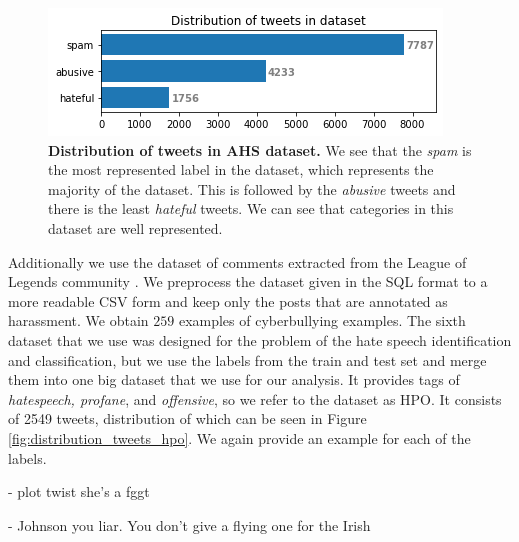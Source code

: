 \documentclass[fleqn,moreauthors,10pt]{ds_report}
\newcommand\bm{0.2pt}
\begin{document}
\begin{figure}[ht]\centering
	\includegraphics[width=\linewidth]{distribution_tweets_dataset2.png}
	\caption{\textbf{Distribution of tweets in AHS dataset.} We see that the \textit{spam} is the most represented label in the dataset, which represents the majority of the dataset. This is followed by the \textit{abusive} tweets and there is the least \textit{hateful} tweets. We can see that categories in this dataset are well represented.}
	\label{fig:distribution_tweets_dataset2}
\end{figure}

\noindent Additionally we use the dataset of comments extracted from the League of Legends community \cite{bretschneider2016detecting}. We preprocess the dataset given in the SQL format to a more readable CSV form and keep only the posts that are annotated as harassment. We obtain $259$ examples of cyberbullying examples. The sixth dataset that we use was designed for the problem of the hate speech identification and classification, but we use the labels from the train and test set and merge them into one big dataset that we use for our analysis. It provides tags of \textit{hatespeech, profane}, and \textit{offensive}, so we refer to the dataset as HPO. It consists of 2549 tweets, distribution of which can be seen in Figure \ref{fig:distribution_tweets_hpo}. We again provide an example for each of the labels.

\begin{tcolorbox}[colback=black!8, width=0.9\linewidth, center,arc=8pt,sharp corners=downhill, boxrule=0.3pt, left=\bm, top=\bm, right=\bm, bottom=\bm, fontupper=\small]
 - plot twist she's a fggt
\end{tcolorbox}

\begin{tcolorbox}[width=0.9\linewidth, center,arc=8pt,sharp corners=downhill, boxrule=0.3pt, left=\bm, top=\bm, right=\bm, bottom=\bm, fontupper=\small]
 - Johnson you liar. You don't give a flying one for the Irish
\end{tcolorbox}
\end{document}
